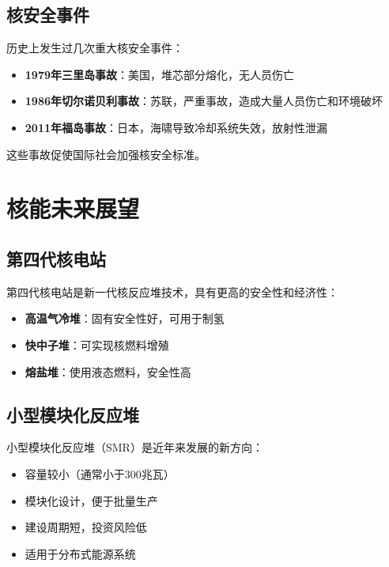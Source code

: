 \documentclass[12pt,UTF8]{ctexbook}
\begin{document}
\section{核安全事件}

历史上发生过几次重大核安全事件：

\begin{itemize}[leftmargin=2cm]
    \item \textbf{1979年三里岛事故}：美国，堆芯部分熔化，无人员伤亡
    \item \textbf{1986年切尔诺贝利事故}：苏联，严重事故，造成大量人员伤亡和环境破坏
    \item \textbf{2011年福岛事故}：日本，海啸导致冷却系统失效，放射性泄漏
\end{itemize}

这些事故促使国际社会加强核安全标准。

\chapter{核能未来展望}

\section{第四代核电站}

第四代核电站是新一代核反应堆技术，具有更高的安全性和经济性：

\begin{itemize}[leftmargin=2cm]
    \item \textbf{高温气冷堆}：固有安全性好，可用于制氢
    \item \textbf{快中子堆}：可实现核燃料增殖
    \item \textbf{熔盐堆}：使用液态燃料，安全性高
\end{itemize}

\section{小型模块化反应堆}

小型模块化反应堆（SMR）是近年来发展的新方向：

\begin{itemize}[leftmargin=2cm]
    \item 容量较小（通常小于300兆瓦）
    \item 模块化设计，便于批量生产
    \item 建设周期短，投资风险低
    \item 适用于分布式能源系统
\end{itemize}
\end{document}
